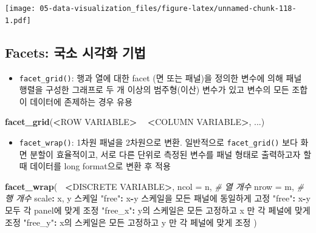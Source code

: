 \documentclass[
  11pt,
]{krantz}
\newenvironment{Shaded}{\begin{snugshade}}{\end{snugshade}}
\newcommand{\CommentTok}[1]{\textcolor[rgb]{0.37,0.37,0.37}{\textit{#1}}}
\newcommand{\DataTypeTok}[1]{\textcolor[rgb]{0.27,0.27,0.27}{#1}}
\newcommand{\ErrorTok}[1]{\textcolor[rgb]{0.14,0.14,0.14}{\textbf{#1}}}
\newcommand{\KeywordTok}[1]{\textcolor[rgb]{0.27,0.27,0.27}{\textbf{#1}}}
\newcommand{\NormalTok}[1]{#1}
\newcommand{\OperatorTok}[1]{\textcolor[rgb]{0.43,0.43,0.43}{\textbf{#1}}}
\newcommand{\StringTok}[1]{\textcolor[rgb]{0.5,0.5,0.5}{#1}}
\providecommand{\tightlist}{%
  \setlength{\itemsep}{0pt}\setlength{\parskip}{0pt}}
\begin{document}
\normalsize

\footnotesize

\texttt{[image: 05-data-visualization\_files/figure-latex/unnamed-chunk-118-1.pdf]}

\normalsize

\hypertarget{facets-uxad6duxc18c-uxc2dcuxac01uxd654-uxae30uxbc95}{%
\subsection{Facets: 국소 시각화 기법}\label{facets-uxad6duxc18c-uxc2dcuxac01uxd654-uxae30uxbc95}}

\begin{itemize}
\tightlist
\item
  \texttt{facet\_grid()}: 행과 열에 대한 facet (면 또는 패널)을 정의한 변수에 의해 패널 행렬을 구성한 그래프로 두 개 이상의 범주형(이산) 변수가 있고 변수의 모든 조합이 데이터에 존제하는 경우 유용
\end{itemize}

\footnotesize

\begin{Shaded}
\begin{Highlighting}[]
\KeywordTok{facet_grid}\NormalTok{(}\OperatorTok{<}\NormalTok{ROW VARIABLE}\OperatorTok{>}\StringTok{ }\ErrorTok{~}\StringTok{ }\ErrorTok{<}\NormalTok{COLUMN VARIABLE}\OperatorTok{>}\NormalTok{, ...)}
\end{Highlighting}
\end{Shaded}

\normalsize

\begin{itemize}
\tightlist
\item
  \texttt{facet\_wrap()}: 1차원 패널을 2차원으로 변환. 일반적으로 \texttt{facet\_grid()} 보다 화면 분할이 효율적이고, 서로 다른 단위로 측정된 변수를 패널 형태로 출력하고자 할 때 데이터를 long format으로 변환 후 적용
\end{itemize}

\footnotesize

\begin{Shaded}
\begin{Highlighting}[]
\KeywordTok{facet_wrap}\NormalTok{(}\OperatorTok{~}\StringTok{ }\ErrorTok{<}\NormalTok{DISCRETE VARIABLE}\OperatorTok{>}\NormalTok{, }
           \DataTypeTok{ncol =}\NormalTok{ n,  }\CommentTok{# 열 개수}
           \DataTypeTok{nrow =}\NormalTok{ m,  }\CommentTok{# 행 개수}
\NormalTok{           scale}\OperatorTok{:}\StringTok{ }\NormalTok{x, y 스케일}
                  \StringTok{"free"}\OperatorTok{:}\StringTok{ }\NormalTok{x}\OperatorTok{-}\NormalTok{y 스케일을 모든 패널에 동일하게 고정}
                  \StringTok{"free"}\OperatorTok{:}\StringTok{ }\NormalTok{x}\OperatorTok{-}\NormalTok{y 모두 각 panel에 맞게 조정}
                  \StringTok{"free_x"}\OperatorTok{:}\StringTok{ }\NormalTok{y의 스케일은 모든 고정하고 x 만 각 페널에 맞게 조정}
                  \StringTok{"free_y"}\OperatorTok{:}\StringTok{ }\NormalTok{x의 스케일은 모든 고정하고 y 만 각 페널에 맞게 조정}
\NormalTok{           )}
\end{Highlighting}
\end{Shaded}
\end{document}
